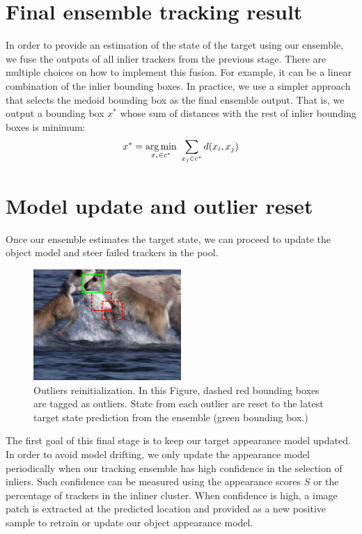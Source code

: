 \section{Final ensemble tracking result}
In order to provide an estimation of the state of the target using our
ensemble, we fuse the outputs of all inlier trackers from the previous stage.
There are multiple choices on how to implement this fusion. For example,
it can be a linear combination of the inlier bounding boxes. In practice,
we use a simpler approach that selects the medoid bounding box as the final
ensemble output. That is, we output a
bounding box $x^{*}$
whose sum of distances with the rest of inlier bounding boxes
is minimum:
\begin{equation}
x^{*} = \operatorname*{arg\,min}_{x_{i} \in c^*}  ~\sum_{x_{j} \in c^{*}}d(x_{i}, x_{j}) 
\end{equation}

\section{Model update and outlier reset}
Once our ensemble estimates the target state, we can proceed to update the
object model and steer failed trackers in the pool.

\begin{figure}[b!]
\centering
\includegraphics[width=0.5\textwidth]{Figures/clustering/deer_outliers.png}
\caption[Outliers reinitialization]{Outliers reinitialization. In this Figure,
dashed red bounding boxes are tagged as outliers. State from each outlier are
reset to the latest target state prediction from the ensemble (green bounding
box.)}
\label{fig::outliers}
\end{figure}

The first goal of this final stage is to keep our target appearance model
updated. In order to avoid model drifting, we only update the appearance
model periodically when our tracking ensemble has high confidence in the
selection of inliers. Such confidence can be measured using the appearance
scores $S$ or the percentage of trackers in the inliner cluster.
When confidence is high, a image patch is extracted at the predicted
location and provided as a new positive sample to retrain or update
our object appearance model.


